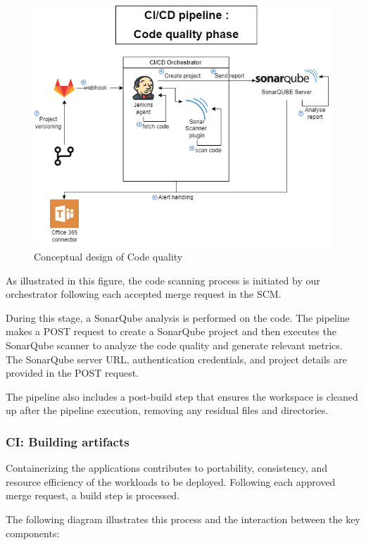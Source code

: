 \begin{figure}[H]\centering
\includegraphics[width=1.0\textwidth,angle=00]{assets/f48.png}
\caption{ Conceptual design of Code quality }
\label{fig:conceptual design of Code quality }
\end{figure}

As illustrated in this figure, the code scanning process is initiated by our orchestrator following each accepted merge request in the SCM.

During this stage, a SonarQube analysis is performed on the code. The pipeline makes a POST request to create a SonarQube project and then executes the SonarQube scanner to analyze the code quality and generate relevant metrics. The SonarQube server URL, authentication credentials, and project details are provided in the POST request.

The pipeline also includes a post-build step that ensures the workspace is cleaned up after the pipeline execution, removing any residual files and directories.
 

\subsubsection{CI: Building artifacts}

Containerizing the applications contributes to portability, consistency, and resource efficiency of the workloads to be deployed. Following each approved merge request, a build step is processed. 

The following diagram illustrates this process and the interaction between the key components: 

